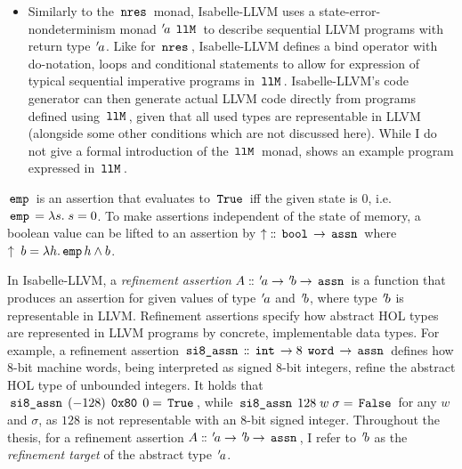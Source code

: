 \begin{itemize}
	      For $\mapsto \dbcolon \tv{a} \app \iexp{ptr} \rightarrow \tv{a} \rightarrow \iexp{assn}$, the assertion $(p \mapsto a) \app \sigma$ evaluates to $\iexp{True}$, iff $p$ is a pointer to $a$ in state $\sigma$\footnote{$\mapsto$ is based on the assertion $\iexp{ll\_bpto}$, which is defined in the theory .}.
	      Note that $p \mapsto a$ implicitly states exclusive ownership of the object $p$ points to, as no object can have multiple separate owners in the separation logic.
	       discusses this more thoroughly as this observation introduces the main challenge for the migration of Pastèque to Isabelle-LLVM.
	\item Similarly to the $\,\text{\ttfamily nres}\,$ monad, Isabelle-LLVM uses a state-error-nondeterminism monad ${\mskip2mu '\mskip-2mua} \; \,\text{\ttfamily llM}\,$ to describe sequential LLVM programs with return type ${\mskip2mu '\mskip-2mua}$.
	      Like for $\,\text{\ttfamily nres}\,$, Isabelle-LLVM defines a bind operator with do-notation, loops and conditional statements to allow for expression of typical sequential imperative programs in $\,\text{\ttfamily llM}\,$.
	      Isabelle-LLVM's code generator can then generate actual LLVM code directly from programs defined using $\,\text{\ttfamily llM}\,$, given that all used types are representable in LLVM (alongside some other conditions which are not discussed here).
	      While I do not give a formal introduction of the $\,\text{\ttfamily llM}\,$ monad,  shows an example program expressed in $\,\text{\ttfamily llM}\,$.
\end{itemize}

$\,\text{\ttfamily emp}\,$ is an assertion that evaluates to $\iexp{True}$ iff the given state is $0$, i.e. $\,\text{\ttfamily emp}\, = \lambda s. \; s = 0$.
To make assertions independent of the state of memory, a boolean value can be lifted to an assertion by $\uparrow \; \mathrel{\mathord{:}\mkern-1.2mu\mathord{:}} \,\text{\ttfamily bool}\, \rightarrow \,\text{\ttfamily assn}\,$ where $\uparrow \; b = \lambda h. \,\text{\ttfamily emp}\, h \land b$.

In Isabelle-LLVM, a \textit{refinement assertion} $A \mathrel{\mathord{:}\mkern-1.2mu\mathord{:}} {\mskip2mu '\mskip-2mua} \rightarrow {\mskip2mu '\mskip-2mub} \rightarrow \,\text{\ttfamily assn}\,$ is a function that produces an assertion for given values of type ${\mskip2mu '\mskip-2mua}$ and ${\mskip2mu '\mskip-2mub}$, where type ${\mskip2mu '\mskip-2mub}$ is representable in LLVM.
Refinement assertions specify how abstract HOL types are represented in LLVM programs by concrete, implementable data types.
For example, a refinement assertion $\,\text{\ttfamily si8\_assn}\, \mathrel{\mathord{:}\mkern-1.2mu\mathord{:}} \,\text{\ttfamily int}\, \rightarrow 8 \; \,\text{\ttfamily word}\, \rightarrow \,\text{\ttfamily assn}\,$ defines how 8-bit machine words, being interpreted as signed 8-bit integers, refine the abstract HOL type of unbounded integers.
It holds that $\,\text{\ttfamily si8\_assn}\, \; (-128) \; \,\text{\ttfamily 0x80}\, \; 0 = \,\text{\ttfamily True}\,$, while $\,\text{\ttfamily si8\_assn}\, \; 128 \; w \; \sigma = \,\text{\ttfamily False}\,$ for any $w$ and $\sigma$, as $128$ is not representable with an 8-bit signed integer.
Throughout the thesis, for a refinement assertion $A \mathrel{\mathord{:}\mkern-1.2mu\mathord{:}} {\mskip2mu '\mskip-2mua} \rightarrow {\mskip2mu '\mskip-2mub} \rightarrow \,\text{\ttfamily assn}\,$, I refer to ${\mskip2mu '\mskip-2mub}$ as the \textit{refinement target} of the abstract type ${\mskip2mu '\mskip-2mua}$.

